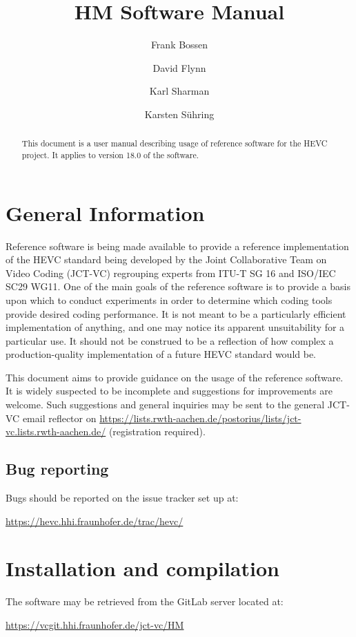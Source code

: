 \documentclass[a4paper,11pt]{jvetdoc}
\title{HM Software Manual}
\author{%
	Frank Bossen
	\email{frank@bossentech.com}
	\and
	David Flynn
	\email{dflynn@blackberry.com}
	\and
	Karl Sharman
	\email{karl.sharman@eu.sony.com}
	\and
	Karsten S\"uhring
	\email{karsten.suehring@hhi.fraunhofer.de}
}
\begin{document}
\maketitle
\begin{abstract}
This document is a user manual describing usage of reference software
for the HEVC project. It applies to version 18.0
of the software.
\end{abstract}

\tableofcontents
\listoftables



\section{General Information}
Reference software is being made available to provide a reference
implementation of the HEVC standard being developed by the Joint
Collaborative Team on Video Coding (JCT-VC) regrouping experts from
ITU-T SG 16 and ISO/IEC SC29 WG11. One of the main goals of the
reference software is to provide a basis upon which to conduct
experiments in order to determine which coding tools provide desired
coding performance. It is not meant to be a particularly efficient
implementation of anything, and one may notice its apparent
unsuitability for a particular use. It should not be construed to be a
reflection of how complex a production-quality implementation of a
future HEVC standard would be.

This document aims to provide guidance on the usage of the reference
software. It is widely suspected to be incomplete and suggestions for
improvements are welcome. Such suggestions and general inquiries may be
sent to the general JCT-VC email reflector on
\url{https://lists.rwth-aachen.de/postorius/lists/jct-vc.lists.rwth-aachen.de/} 
(registration required).

\subsection*{Bug reporting}
Bugs should be reported on the issue tracker set up at:

\url{https://hevc.hhi.fraunhofer.de/trac/hevc/}

\section{Installation and compilation}
The software may be retrieved from the GitLab server located at:

\url{https://vcgit.hhi.fraunhofer.de/jct-vc/HM}
\end{document}
